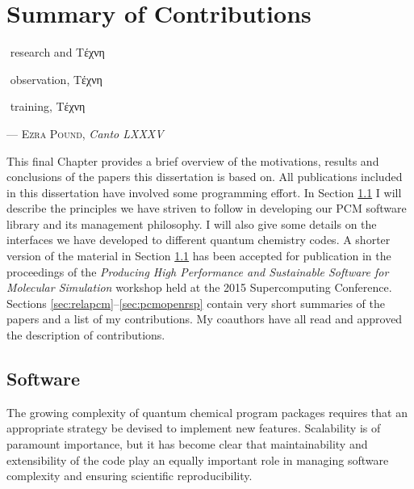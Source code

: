\chapter{Summary of Contributions}\label{ch:contributions-summary}

\epigraph{\textonehalf\,\,research \kern 20pt and \textonehalf \kern 20pt \textgreek{Tέχνη}

          \textonehalf\,\,observation, \kern 21pt \textonehalf \kern 20pt \textgreek{Tέχνη}

          \textonehalf\,\,training, \kern 35pt \textonehalf \kern 20pt \textgreek{Tέχνη}
          }{
  --- \textsc{Ezra Pound}, \textit{Canto LXXXV}}

This final Chapter provides a brief overview of the motivations, results and
conclusions of the papers this dissertation is based on.
All publications included in this dissertation have involved some programming effort.
In Section \ref{sec:software} I will describe the principles we have
striven to follow in developing our \acrshort{PCM} software library and its
management philosophy.
I will also give some details on the interfaces we have developed to different
quantum chemistry codes.
A shorter version of the material in Section \ref{sec:software} has been
accepted for publication in the proceedings of the \emph{Producing High
Performance and Sustainable Software for Molecular Simulation} workshop
held at the 2015 Supercomputing Conference.\autocite{%
DiRemigio2016-es}
Sections \ref{sec:relapcm}--\ref{sec:pcmopenrsp} contain very short
summaries of the papers and a list of my contributions.
My coauthors have all read and approved the description of contributions.

\section{Software}\label{sec:software}

The growing complexity of quantum chemical program packages requires that an
appropriate strategy be devised to implement new features.
Scalability is of paramount importance, but it has become clear that
maintainability and extensibility of the code play an equally important role in
managing software complexity\autocite{Wilson2014-vh, ssi, nsf-s2i2,
netherlands-escience, coderefinery, molssi} and ensuring
scientific reproducibility.\autocite{Hatton1994-us, Hatton1997-ml,
Hatton1997-bb, Ioannidis2005-aj, Merali2010-uy, Prinz2011-kz}

